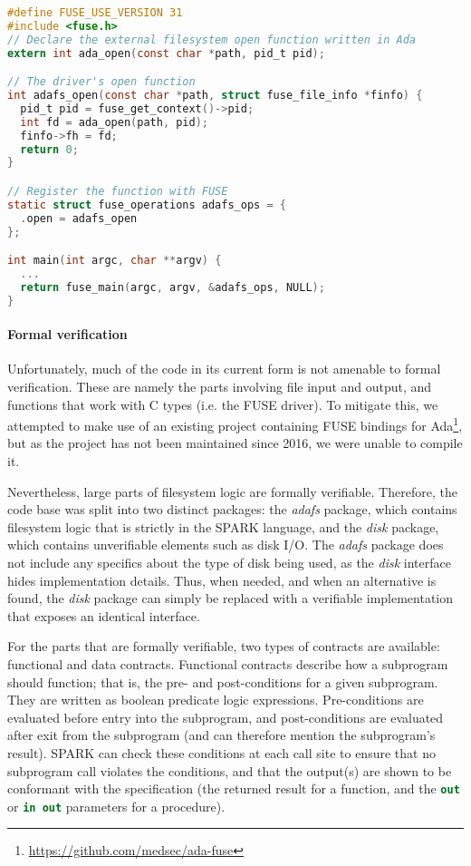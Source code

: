 \begin{lstlisting}[caption={FUSE driver implementation of \textnormal{open}}, label={code:fuse open}, language=C]
#define FUSE_USE_VERSION 31
#include <fuse.h>
// Declare the external filesystem open function written in Ada
extern int ada_open(const char *path, pid_t pid);

// The driver's open function
int adafs_open(const char *path, struct fuse_file_info *finfo) {
  pid_t pid = fuse_get_context()->pid;
  int fd = ada_open(path, pid);
  finfo->fh = fd;
  return 0;
}

// Register the function with FUSE
static struct fuse_operations adafs_ops = {
  .open = adafs_open
};

int main(int argc, char **argv) {
  ...
  return fuse_main(argc, argv, &adafs_ops, NULL);
}
\end{lstlisting}

\paragraph{Formal verification}
Unfortunately, much of the code in its current form is not amenable to formal verification.
These are namely the parts involving file input and output, and functions that work with C types (i.e. the FUSE driver).
To mitigate this, we attempted to make use of an existing project containing FUSE bindings for Ada\footnote{\url{https://github.com/medsec/ada-fuse}}, but as the project has not been maintained since 2016, we were unable to compile it.

Nevertheless, large parts of filesystem logic are formally verifiable.
Therefore, the code base was split into two distinct packages: the \textit{adafs} package, which contains filesystem logic that is strictly in the SPARK language, and the \textit{disk} package, which contains unverifiable elements such as disk I/O.
The \textit{adafs} package does not include any specifics about the type of disk being used, as the \textit{disk} interface hides implementation details.
Thus, when needed, and when an alternative is found, the \textit{disk} package can simply be replaced with a verifiable implementation that exposes an identical interface.

For the parts that are formally verifiable, two types of contracts are available: functional and data contracts.
Functional contracts describe how a subprogram should function; that is, the pre- and post-conditions for a given subprogram.
They are written as boolean predicate logic expressions.
Pre-conditions are evaluated before entry into the subprogram, and post-conditions are evaluated after exit from the subprogram (and can therefore mention the subprogram's result).
SPARK can check these conditions at each call site to ensure that no subprogram call violates the conditions, and that the output(s) are shown to be conformant with the specification (the returned result for a function, and the \lstinline[language=Ada]{out} or \lstinline[language=Ada]{in out} parameters for a procedure).

